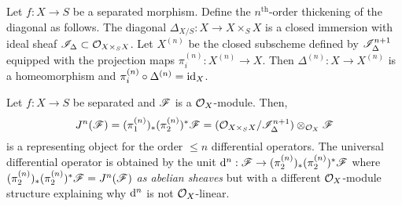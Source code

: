 \documentclass[12pt]{article}
\begin{document}
\begin{defn}
Let $f : X \to S$ be a separated morphism. Define the $n^{\text{th}}$-order thickening of the diagonal as follows. The diagonal $\Delta_{X/S} : X \to X \times_S X$ is a closed immersion with ideal sheaf $\mathscr{I}_{\Delta} \subset \mathcal{O}_{X \times_S X}$. Let $X^{(n)}$ be the closed subscheme defined by $\mathscr{I}_{\Delta}^{n+1}$ equipped with the projection maps $\pi_i^{(n)} : X^{(n)} \to X$. Then $\Delta^{(n)} : X \to X^{(n)}$ is a homeomorphism and $\pi_i^{(n)} \circ \Delta^{(n)} = \mathrm{id}_X$.
\end{defn}

\begin{prop}
Let $f : X \to S$ be separated and $\mathscr{F}$ is a $\mathcal{O}_{X}$-module. Then,
\[ J^n(\mathscr{F}) = (\pi_1^{(n)})_* (\pi_2^{(n)})^* \mathscr{F} = (\mathcal{O}_{X \times_S X} / \mathscr{I}_\Delta^{n+1}) \otimes_{\mathcal{O}_{X}} \mathscr{F} \]
is a representing object for the order $\le n$ differential operators. The universal differential operator is obtained by the unit $\mathrm{d}^n : \mathscr{F} \to (\pi_2^{(n)})_* (\pi_2^{(n)})^* \mathscr{F}$ where $(\pi_2^{(n)})_* (\pi_2^{(n)})^* \mathscr{F} = J^n(\mathscr{F})$ \textit{as abelian sheaves} but with a different $\mathcal{O}_{X}$-module structure explaining why $\mathrm{d}^n$ is not $\mathcal{O}_{X}$-linear.
\end{prop}
\end{document}
